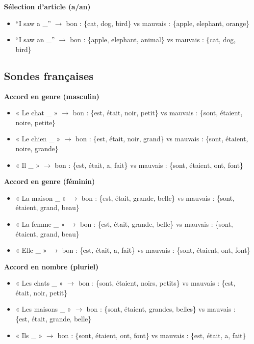 \documentclass[11pt,a4paper]{article}
\begin{document}
\textbf{Sélection d'article (a/an)}
\begin{itemize}
    \item ``I saw a \_'' $\rightarrow$ bon : \{cat, dog, bird\} vs mauvais : \{apple, elephant, orange\}
    \item ``I saw an \_'' $\rightarrow$ bon : \{apple, elephant, animal\} vs mauvais : \{cat, dog, bird\}
\end{itemize}

\subsection{Sondes françaises}

\textbf{Accord en genre (masculin)}
\begin{itemize}
    \item « Le chat \_ » $\rightarrow$ bon : \{est, était, noir, petit\} vs mauvais : \{sont, étaient, noire, petite\}
    \item « Le chien \_ » $\rightarrow$ bon : \{est, était, noir, grand\} vs mauvais : \{sont, étaient, noire, grande\}
    \item « Il \_ » $\rightarrow$ bon : \{est, était, a, fait\} vs mauvais : \{sont, étaient, ont, font\}
\end{itemize}

\textbf{Accord en genre (féminin)}
\begin{itemize}
    \item « La maison \_ » $\rightarrow$ bon : \{est, était, grande, belle\} vs mauvais : \{sont, étaient, grand, beau\}
    \item « La femme \_ » $\rightarrow$ bon : \{est, était, grande, belle\} vs mauvais : \{sont, étaient, grand, beau\}
    \item « Elle \_ » $\rightarrow$ bon : \{est, était, a, fait\} vs mauvais : \{sont, étaient, ont, font\}
\end{itemize}

\textbf{Accord en nombre (pluriel)}
\begin{itemize}
    \item « Les chats \_ » $\rightarrow$ bon : \{sont, étaient, noirs, petits\} vs mauvais : \{est, était, noir, petit\}
    \item « Les maisons \_ » $\rightarrow$ bon : \{sont, étaient, grandes, belles\} vs mauvais : \{est, était, grande, belle\}
    \item « Ils \_ » $\rightarrow$ bon : \{sont, étaient, ont, font\} vs mauvais : \{est, était, a, fait\}
\end{itemize}
\end{document}
